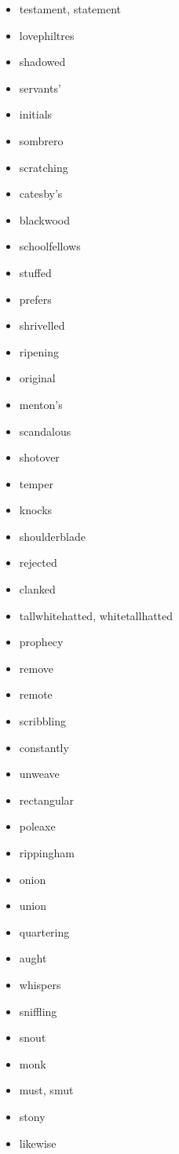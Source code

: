 \documentclass{article}
\begin{document}
\begin{itemize}
    \item testament, statement
    \item lovephiltres
    \item shadowed
    \item servants'
    \item initials
    \item sombrero
    \item scratching
    \item catesby's
    \item blackwood
    \item schoolfellows
    \item stuffed
    \item prefers
    \item shrivelled
    \item ripening
    \item original
    \item menton's
    \item scandalous
    \item shotover
    \item temper
    \item knocks
    \item shoulderblade
    \item rejected
    \item clanked
    \item tallwhitehatted, whitetallhatted
    \item prophecy
    \item remove
    \item remote
    \item scribbling
    \item constantly
    \item unweave
    \item rectangular
    \item poleaxe
    \item rippingham
    \item onion
    \item union
    \item quartering
    \item aught
    \item whispers
    \item sniffling
    \item snout
    \item monk
    \item must, smut
    \item stony
    \item likewise

\end{itemize}
\end{document}
